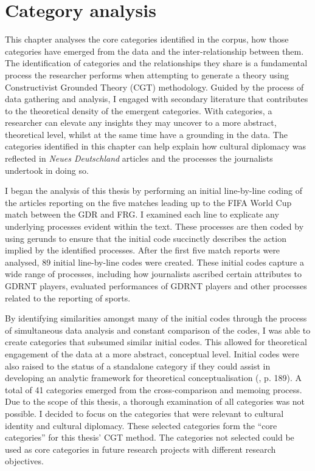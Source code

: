 \chapter{Category analysis\label{cha:catanalysis}}

This chapter analyses the core categories identified in the corpus, how those categories have emerged from the data and the inter-relationship between them. The identification of categories and the relationships they share is a fundamental process the researcher performs when attempting to generate a theory using Constructivist Grounded Theory (CGT) methodology. Guided by the process of data gathering and analysis, I engaged with secondary literature that contributes to the theoretical density of the emergent categories. With categories, a researcher can elevate any insights they may uncover to a more abstract, theoretical level, whilst at the same time have a grounding in the data. The categories identified in this chapter can help explain how cultural diplomacy was reflected in \textit{Neues Deutschland} articles and the processes the journalists undertook in doing so.

I began the analysis of this thesis by performing an initial line-by-line coding of the articles reporting on the five matches leading up to the FIFA World Cup match between the GDR and FRG. I examined each line to explicate any underlying processes evident within the text. These processes are then coded by using gerunds to ensure that the initial code succinctly describes the action implied by the identified processes. After the first five match reports were analysed, 89 initial line-by-line codes were created. These initial codes capture a wide range of processes, including how journalists ascribed certain attributes to GDRNT players, evaluated performances of GDRNT players and other processes related to the reporting of sports.

By identifying similarities amongst many of the initial codes through the process of simultaneous data analysis and constant comparison of the codes, I was able to create categories that subsumed similar initial codes. This allowed for theoretical engagement of the data at a more abstract, conceptual level. Initial codes were also raised to the status of a standalone category if they could assist in developing an analytic framework for theoretical conceptualisation (\cite{charmaz2014}, p. 189). A total of 41 categories emerged from the cross-comparison and memoing process. Due to the scope of this thesis, a thorough examination of all categories was not possible. I decided to focus on the categories that were relevant to cultural identity and cultural diplomacy. These selected categories form the “core categories” for this thesis’ CGT method. The categories not selected could be used as core categories in future research projects with different research objectives.

